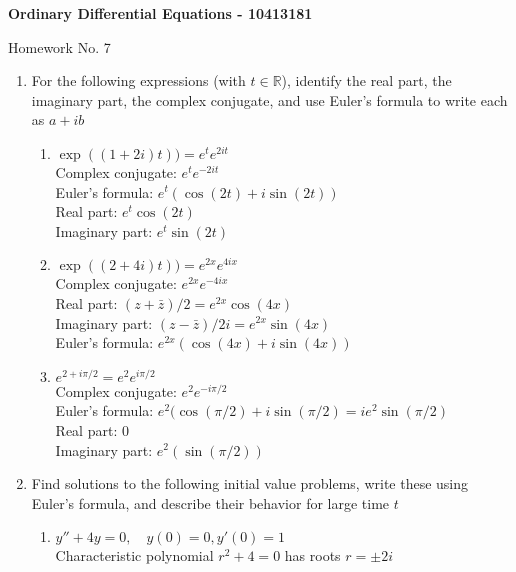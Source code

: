 \documentclass[10pt,a4paper]{letter}
\begin{document}
\begin{center}
\begin{Large}
\textbf{Ordinary Differential Equations - 10413181}\\
\end{Large}
\vspace{1em}
\begin{large}Homework No. 7\end{large}
\end{center}

\begin{enumerate}
\item For the following expressions (with $t \in \mathbb{R}$), identify the real part, the imaginary part, the complex conjugate, and use Euler's formula to write each as $a + i b$
\begin{enumerate}
\item $ \exp((1+2i)t)) = e^t e^{2it} $ \\
Complex conjugate: $ e^t e^{-2it} $ \\
Euler's formula: $e^t(\cos(2t) + i \sin(2t))$ \\
Real part: $e^t \cos(2t)$ \\
Imaginary part: $e^t \sin(2t)$
\item $ \exp((2+4i)t)) = e^{2x} e^{4ix}$ \\
Complex conjugate: $e^{2x} e^{-4ix}$ \\
Real part: $ (z + \bar{z})/2 = e^{2x} \cos(4x) $\\
Imaginary part: $(z - \bar{z})/2i = e^{2x} \sin(4x)$ \\
Euler's formula: $e^{2x} (\cos(4x) + i \sin(4x)) $
\item $e^{2 + i\pi/2} = e^2 e^{i\pi/2}$ \\
Complex conjugate: $e^2 e^{-i \pi/2} $\\
Euler's formula: $e^2(\cos(\pi/2) + i \sin(\pi/2) = i e^2 \sin(\pi/2)$ \\
Real part: 0 \\
Imaginary part: $e^2(\sin(\pi/2))$ 
\end{enumerate}
\item Find solutions to the following initial value problems, write these using Euler's formula, and describe their behavior for large time $t$
\begin{enumerate}
\item $y'' + 4y = 0, \quad y(0) = 0, y'(0)=1 $ \\
Characteristic polynomial $r^2 + 4 = 0$ has roots $ r = \pm 2i$ \\

\end{enumerate}
\end{enumerate}
\end{document}
